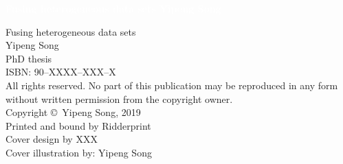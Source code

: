 {\pagestyle{empty}
\newcommand{\printtitle}{%
{\Huge\bf Fusing heterogeneous data sets}}  %

\begin{titlepage}
\pagecolor{hanblue}\afterpage{\nopagecolor}
\par\vskip 2cm
\begin{center}
\Huge\bf \textcolor{white}{Fusing heterogeneous data sets}
\vfill
{\LARGE\bf \textcolor{white}{Yipeng Song}}                           %
\vskip 2cm
\end{center}
\end{titlepage}

\newpage
\noindent%
{
\vfill
\noindent%
Fusing heterogeneous data sets \\
Yipeng Song \\
PhD thesis \\
ISBN: 90--XXXX--XXX--X \\[2ex]     %

\noindent%
All rights reserved. No part of this publication may be reproduced in any form
without written permission from the copyright owner.\\[2ex]

\noindent%
Copyright \copyright\ Yipeng Song, 2019 \\[2ex] %

\noindent%
Printed and bound by Ridderprint\\    %
Cover design by XXX \\  %
Cover illustration by: Yipeng Song

\vskip 2cm
}

}
